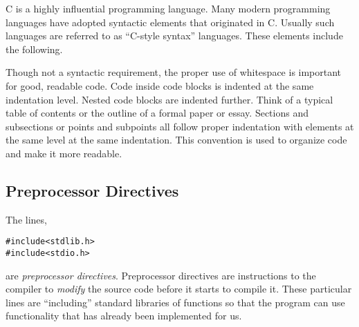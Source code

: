 C is a highly influential programming language.  Many modern programming
languages have adopted syntactic elements that originated in C.  Usually
such languages are referred to as ``C-style syntax'' languages.  These
elements include the following.

Though not a syntactic requirement, the proper use of whitespace is important for
good, readable code.  Code inside code blocks is indented at the same indentation level.
Nested code blocks are indented further.  Think of a typical table of contents or
the outline of a formal paper or essay.  Sections and subsections or points and 
subpoints all follow proper indentation with elements at the same level at the same
indentation.  This convention is used to organize code and make it more readable.
 
\subsection{Preprocessor Directives}

The lines, 

\begin{verbatim}
#include<stdlib.h>
#include<stdio.h>
\end{verbatim}

are \emph{preprocessor directives}.  Preprocessor directives are instructions to
the compiler to \emph{modify} the source code before it starts to compile it.  These
particular lines are ``including'' standard libraries of functions so that the program can
use functionality that has already been implemented for us.  

